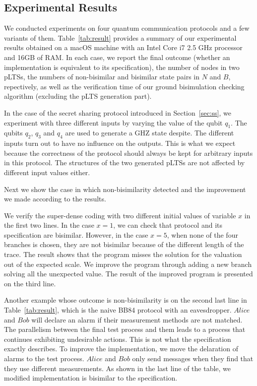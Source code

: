 \documentclass[a4paper,UKenglish,cleveref, autoref]{lipics-v2019}
\begin{document}
\subsection{Experimental Results}
We conducted experiments on four quantum communication protocols and a few variants of them.  
Table~\ref{tab:result} provides a summary of our experimental results obtained on a macOS machine with an Intel Core i7 2.5 GHz processor and 16GB of RAM.  In each case, we report the final outcome (whether an implementation is equivalent to its specification), the number of nodes in two pLTSs, the numbers of non-bisimilar and bisimilar state pairs in $N$ and $B$, repectively, as well as the verification time of our ground bisimulation checking algorithm (excluding the pLTS generation part).

In the case of the secret sharing protocol introduced in Section~\ref{sec:ss}, we  experiment with three different inputs by varying the value of the qubit $q_1$. The qubits $q_2$, $q_3$ and $q_4$ are used to generate a GHZ state despite. The different inputs turn out to have no influence on the outputs. This is what we expect because the correctness of the protocol should always be kept for arbitrary inputs in this protocol. The structures of the two generated pLTSs are  not affected by different input values either.

Next we show the case in which non-bisimilarity detected and the improvement we made according to the results.

We verify the super-dense coding with two different initial values of variable $x$ in the first two lines. In the case $x=1$, we can check that protocol and its specification are bisimilar. However, in the case $x=5$, when none of the four branches is chosen, they are not bisimilar because of the different length of the trace. The result shows that the program misses the solution for the valuation out of the expected scale. We improve the program through adding a new branch solving all the unexpected value. The result of the improved program is presented on the third line. 


Another example whose outcome is non-bisimilarity is on the second last line in Table~\ref{tab:result}, which is the naive BB84 protocol with an eavesdropper. $Alice$ and $Bob$ will declare an alarm if their measurement methods are not matched. The parallelism between the final test process and them leads to a process that continues exhibiting undesirable  actions. This is not what the specification exactly describes. To improve the implementation, we  move the delaration of alarms to the test process. $Alice$ and $Bob$ only send messages when they find that they use different measurements. As shown in the last line of the table, we modified implementation is bisimilar to the specification.
\end{document}
